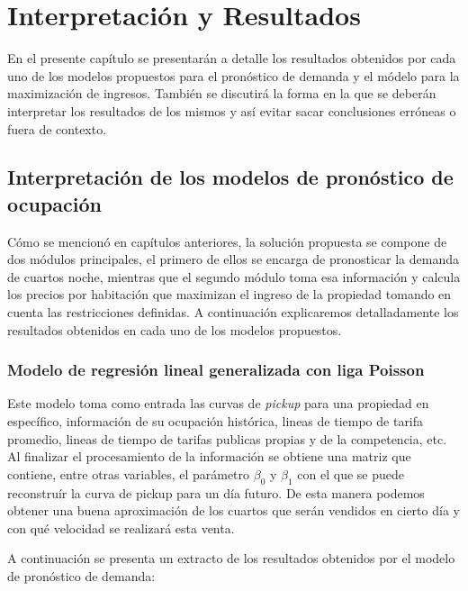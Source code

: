 \chapter{Interpretación y Resultados}
\label{ch:results}

En el presente capítulo se presentarán a detalle los resultados obtenidos por cada uno de los modelos propuestos para el pronóstico de demanda y el módelo para la maximización de ingresos. También se discutirá la forma en la que se deberán interpretar los resultados de los mismos y así evitar sacar conclusiones erróneas o fuera de contexto.

\section*{Interpretación de los modelos de pronóstico de ocupación}
Cómo se mencionó en capítulos anteriores, la solución propuesta se compone de dos módulos principales, el primero de ellos se encarga de pronosticar la demanda de cuartos noche, mientras que el segundo módulo toma esa información y calcula los precios por habitación  que  maximizan  el  ingreso  de  la  propiedad  tomando  en  cuenta  las restricciones definidas. A continuación explicaremos detalladamente los resultados obtenidos en cada uno de los modelos propuestos.


\subsection*{Modelo de regresión lineal generalizada con liga Poisson}

Este modelo toma como entrada las curvas de \emph{pickup} para una propiedad en específico, información de su ocupación histórica, lineas de tiempo de tarifa promedio, lineas de tiempo de tarifas publicas propias y de la competencia, etc. Al finalizar el procesamiento de la información se obtiene una matriz que contiene, entre otras variables, el parámetro $\beta_0$ y $\beta_1$ con el que se puede reconstruír la curva de pickup para un día futuro. De esta manera podemos obtener una buena aproximación de los cuartos que serán vendidos en cierto día y con qué velocidad se realizará esta venta.

A continuación se presenta un extracto de los resultados obtenidos por el modelo de pronóstico de demanda:

